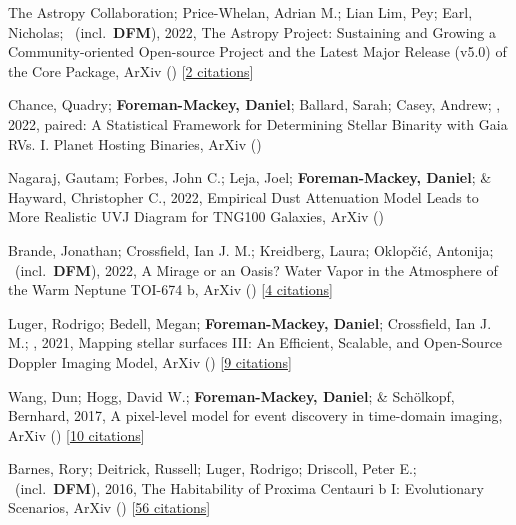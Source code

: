 \item[{\color{numcolor}\scriptsize9}] The Astropy Collaboration; Price-Whelan, Adrian M.; Lian Lim, Pey; Earl, Nicholas; \etal\ (incl.\ \textbf{DFM}), 2022, The Astropy Project: Sustaining and Growing a Community-oriented Open-source Project and the Latest Major Release (v5.0) of the Core Package, ArXiv () [\href{https://ui.adsabs.harvard.edu/abs/2022arXiv220614220T}{2 citations}]

\item[{\color{numcolor}\scriptsize8}] Chance, Quadry; \textbf{Foreman-Mackey, Daniel}; Ballard, Sarah; Casey, Andrew; \etal, 2022, paired: A Statistical Framework for Determining Stellar Binarity with Gaia RVs. I. Planet Hosting Binaries, ArXiv ()

\item[{\color{numcolor}\scriptsize7}] Nagaraj, Gautam; Forbes, John C.; Leja, Joel; \textbf{Foreman-Mackey, Daniel}; \& Hayward, Christopher C., 2022, Empirical Dust Attenuation Model Leads to More Realistic UVJ Diagram for TNG100 Galaxies, ArXiv ()

\item[{\color{numcolor}\scriptsize6}] Brande, Jonathan; Crossfield, Ian J. M.; Kreidberg, Laura; Oklop{\v{c}}i{\'c}, Antonija; \etal\ (incl.\ \textbf{DFM}), 2022, A Mirage or an Oasis? Water Vapor in the Atmosphere of the Warm Neptune TOI-674 b, ArXiv () [\href{https://ui.adsabs.harvard.edu/abs/2022arXiv220104197B}{4 citations}]

\item[{\color{numcolor}\scriptsize5}] Luger, Rodrigo; Bedell, Megan; \textbf{Foreman-Mackey, Daniel}; Crossfield, Ian J. M.; \etal, 2021, Mapping stellar surfaces III: An Efficient, Scalable, and Open-Source Doppler Imaging Model, ArXiv () [\href{https://ui.adsabs.harvard.edu/abs/2021arXiv211006271L}{9 citations}]

\item[{\color{numcolor}\scriptsize4}] Wang, Dun; Hogg, David W.; \textbf{Foreman-Mackey, Daniel}; \& Sch{\"o}lkopf, Bernhard, 2017, A pixel-level model for event discovery in time-domain imaging, ArXiv () [\href{https://ui.adsabs.harvard.edu/abs/2017arXiv171002428W}{10 citations}]

\item[{\color{numcolor}\scriptsize3}] Barnes, Rory; Deitrick, Russell; Luger, Rodrigo; Driscoll, Peter E.; \etal\ (incl.\ \textbf{DFM}), 2016, The Habitability of Proxima Centauri b I: Evolutionary Scenarios, ArXiv () [\href{https://ui.adsabs.harvard.edu/abs/2016arXiv160806919B}{56 citations}]


